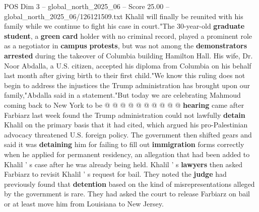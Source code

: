 \begin{textsample}{POS Dim 3 – global\_north\_2025\_06 – Score 25.00 – global\_north\_2025\_06/126121509.txt}
Khalil will finally be reunited with his family while we continue to fight his case in court."The 30-year-old \textbf{graduate} \textbf{student}, a \textbf{green} \textbf{card} holder with no criminal record, played a prominent role as a negotiator in \textbf{campus} \textbf{protests}, but was not among the \textbf{demonstrators} \textbf{arrested} during the takeover of Columbia building Hamilton Hall.
His wife, Dr.
Noor Abdalla, a U.S. citizen, accepted his diploma from Columbia on his behalf last month after giving birth to their first child."We know this ruling does not begin to address the injustices the Trump administration has brought upon our family,"Abdalla said in a statement."But today we are celebrating Mahmoud coming back to New York to be @ @ @ @ @ @ @ @ @ @ \textbf{hearing} came after Farbiarz last week found the Trump administration could not lawfully \textbf{detain} Khalil on the primary basis that it had cited, which argued his pro-Palestinian advocacy threatened U.S. foreign policy.
The government then shifted gears and said it was \textbf{detaining} him for failing to fill out \textbf{immigration} forms correctly when he applied for permanent residency, an allegation that had been added to Khalil ' s case after he was already being held.
Khalil ' s \textbf{lawyers} then asked Farbiarz to revisit Khalil ' s request for bail.
They noted the \textbf{judge} had previously found that \textbf{detention} based on the kind of misrepresentations alleged by the government is rare.
They had asked the court to release Farbiarz on bail or at least move him from Louisiana to New Jersey.

\end{textsample}
